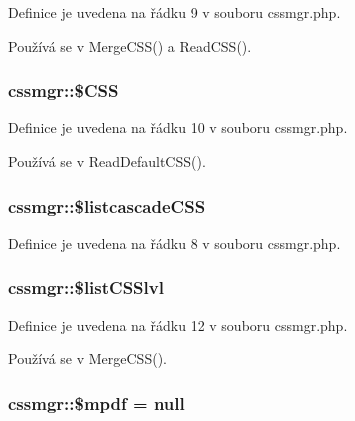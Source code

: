 Definice je uvedena na řádku 9 v souboru cssmgr.\-php.



Používá se v Merge\-C\-S\-S() a Read\-C\-S\-S().

\hypertarget{classcssmgr_af55daafea459b4ea6ca9a9b410219289}{
\subsubsection[{\$\-C\-S\-S}]{\setlength{\rightskip}{0pt plus 5cm}cssmgr\-::\$\-C\-S\-S}}\label{classcssmgr_af55daafea459b4ea6ca9a9b410219289}


Definice je uvedena na řádku 10 v souboru cssmgr.\-php.



Používá se v Read\-Default\-C\-S\-S().

\hypertarget{classcssmgr_a7ae3e26f97363e47042d04366e153bd9}{
\subsubsection[{\$listcascade\-C\-S\-S}]{\setlength{\rightskip}{0pt plus 5cm}cssmgr\-::\$listcascade\-C\-S\-S}}\label{classcssmgr_a7ae3e26f97363e47042d04366e153bd9}


Definice je uvedena na řádku 8 v souboru cssmgr.\-php.

\hypertarget{classcssmgr_a949001a83830f42f39b705d78ee2c835}{
\subsubsection[{\$list\-C\-S\-Slvl}]{\setlength{\rightskip}{0pt plus 5cm}cssmgr\-::\$list\-C\-S\-Slvl}}\label{classcssmgr_a949001a83830f42f39b705d78ee2c835}


Definice je uvedena na řádku 12 v souboru cssmgr.\-php.



Používá se v Merge\-C\-S\-S().

\hypertarget{classcssmgr_a854b00b5dad10f128461f73a69f276df}{
\subsubsection[{\$mpdf}]{\setlength{\rightskip}{0pt plus 5cm}cssmgr\-::\$mpdf = null}}\label{classcssmgr_a854b00b5dad10f128461f73a69f276df}


